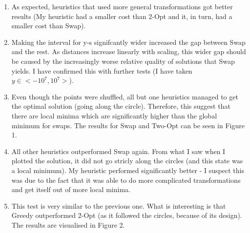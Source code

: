 \documentclass[12pt]{article}
\begin{document}
\begin{enumerate}
\item As expected, heuristics that used more general transformations got better results (My heuristic had a smaller cost than 2-Opt and it, in turn, had a smaller cost than Swap).
\item Making the interval for y-s signifcantly wider increased the gap between Swap and the rest. As distances increase linearly with scaling, this wider gap should be caused by the increasingly worse relative quality of solutions that Swap yields. I have confirmed this with further tests (I have taken $y \in <-10^7,10^7>$).
\item Even though the points were shuffled, all but one heuristics managed to get the optimal solution (going along the circle). Therefore, this suggest that there are local minima which are significantly higher than the global minimum for swaps. The results for Swap and Two-Opt can be seen in Figure 1.
\item All other heuristics outperformed Swap again. From what I saw when I plotted the solution, it did not go stricly along the circles (and this state was a local minimum). My heuristic performed significantly better - I suspect this was due to the fact that it was able to do more complicated transformations and get itself out of more local minima.
\item This test is very similar to the previous one. What is interesting is that Greedy outperformed 2-Opt (as it followed the circles, because of its design). The results are visualised in Figure 2.

\end{enumerate}
\end{document}
